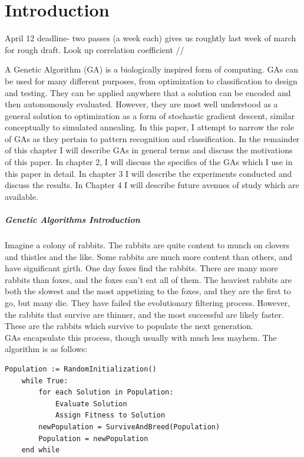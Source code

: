\chapter{Introduction} \label{ch:introduction}

April 12 deadline- two passes (a week each) gives us roughtly last week of march for rough draft.  Look up correlation coefficient //

A Genetic Algorithm (GA) is a biologically inspired form of computing.  GAs can be used for many different purposes, from optimization to classification to design and testing.  They can be applied anywhere that a solution can be encoded and then autonomously evaluated.  However, they are most well understood as a general solution to optimization as a form of stochastic gradient descent, similar conceptually to simulated annealing. In this paper, I attempt to narrow the role of GAs as they pertain to pattern recognition and classification.  In the remainder of this chapter I will describe GAs in general terms and discuss the motivations of this paper.  In chapter 2, I will discuss the specifics of the GAs which I use in this paper in detail.  In chapter 3 I will describe the experiments conducted and discuss the results.  In Chapter 4 I will describe future avenues of study which are available. 
\paragraph{Genetic Algorithms Introduction}
Imagine a colony of rabbits.  The rabbits are quite content to munch on clovers and thistles and the like.  Some rabbits are much more content than others, and have significant girth.  One day foxes find the rabbits. There are many more rabbits than foxes, and the foxes can't eat all of them.  The heaviest rabbits are both the slowest and the most appetizing to the foxes, and they are the first to go, but many die.  They have failed the evolutionary filtering process.  However, the rabbits that survive are thinner, and the most successful are likely faster.  These are the rabbits which survive to populate the next generation.
\\GAs encapsulate this process, though usually with much less mayhem.  The algorithm is as follows:
\begin{lstlisting}[language = algorithm, caption={Basic GA}, label={fig:basicga}]
Population := RandomInitialization()
	while True:
		for each Solution in Population:
			Evaluate Solution
			Assign Fitness to Solution
		newPopulation = SurviveAndBreed(Population)
		Population = newPopulation
	end while
\end{lstlisting}

